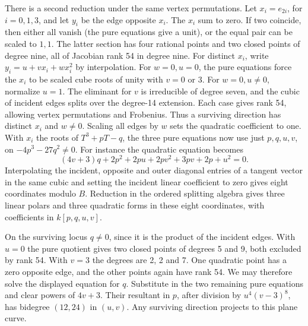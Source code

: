 There is a second reduction under the same vertex permutations. Let
\(x_i=e_{2i}\), for \(i=0,1,3\), and let \(y_i\) be the edge opposite
\(x_i\). The \(x_i\) sum to zero. If two coincide, then either all
vanish (the pure equations give a unit), or the equal pair can be
scaled to \(1,1\). The latter section has four rational points and two
closed points of degree nine, all of Jacobian rank 54 in degree nine.
For distinct \(x_i\), write \(y_i=u+v x_i+w x_i^2\) by interpolation.
For \(w=0,u=0\), the pure equations force the \(x_i\) to be scaled
cube roots of unity with \(v=0\) or \(3\). For \(w=0,u\ne0\),
normalize \(u=1\). The eliminant for \(v\) is irreducible of degree
seven, and the cubic of incident edges splits over the degree-14
extension. Each case gives rank 54, allowing vertex permutations and
Frobenius. Thus a surviving direction has distinct \(x_i\) and \(w\ne0\).
Scaling all edges by \(w\) sets the quadratic coefficient to one.
With \(x_i\) the roots of \(T^3+pT-q\), the three pure equations
now use just \(p,q,u,v\), on \(-4p^3-27q^2\ne0\). For instance the
quadratic equation becomes
\[
 (4v+3)q+2p^2+2pu+2pv^2+3pv+2p+u^2=0 .
\]
Interpolating the incident, opposite and outer diagonal entries of a
tangent vector in the same cubic and setting the incident linear
coefficient to zero gives eight coordinates modulo \(B\). Reduction in
the ordered splitting algebra gives three linear polars and three
quadratic forms in these eight coordinates, with coefficients in
\(k[p,q,u,v]\).

On the surviving locus \(q\ne0\), since it is the product of the incident
edges. With \(u=0\) the pure quotient gives two closed points of degrees
5 and 9, both excluded by rank 54. With \(v=3\) the degrees are 2, 2
and 7. One quadratic point has a zero opposite edge, and the other
points again have rank 54. We may therefore solve the displayed
equation for \(q\). Substitute in the two remaining pure equations and
clear powers of \(4v+3\). Their resultant in \(p\), after division by
\(u^4(v-3)^8\), has bidegree \((12,24)\) in \((u,v)\). Any surviving
direction projects to this plane curve.


